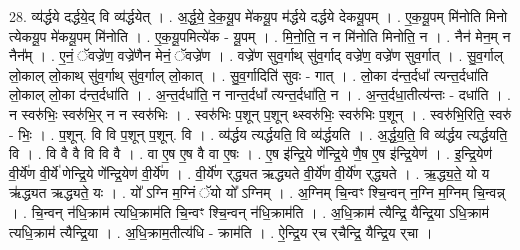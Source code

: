 \documentclass[17pt]{extarticle}
\begin{document}
28. व्य॑र्द्धये दर्द्धये॒द् वि व्य॑र्द्धयेत् । . अ॒र्द्ध॒ये॒ दे॒क॒यू॒प मे॑कयू॒प म॑र्द्धये दर्द्धये देकयू॒पम् । . ए॒क॒यू॒पम् मि॑नोति मिनो त्येकयू॒प मे॑कयू॒पम् मि॑नोति । . ए॒क॒यू॒पमित्ये॑क - यू॒पम् । . मि॒नो॒ति॒ न न मि॑नोति मिनोति॒ न । . नैन॑ मेन॒म् न नैन᳚म् । . ए॒नं॒ ॅवज्रे॑ण॒ वज्रे॑णैन मेनं॒ ॅवज्रे॑ण । . वज्रे॑ण सुव॒र्गाथ् सु॑व॒र्गाद् वज्रे॑ण॒ वज्रे॑ण सुव॒र्गात् । . सु॒व॒र्गाल् लो॒काल् लो॒काथ् सु॑व॒र्गाथ् सु॑व॒र्गाल् लो॒कात् । . सु॒व॒र्गादिति॑ सुवः - गात् । . लो॒का द॑न्त॒र्दधा᳚ त्यन्त॒र्दधा॑ति लो॒काल् लो॒का द॑न्त॒र्दधा॑ति । . अ॒न्त॒र्दधा॑ति॒ न नान्त॒र्दधा᳚ त्यन्त॒र्दधा॑ति॒ न । . अ॒न्त॒र्दधा॒तीत्य॑न्तः - दधा॑ति । . न स्वरु॑भिः॒ स्वरु॑भि॒र् न न स्वरु॑भिः । . स्वरु॑भिः प॒शून् प॒शून् थ्स्वरु॑भिः॒ स्वरु॑भिः प॒शून् । . स्वरु॑भि॒रिति॒ स्वरु॑ - भिः॒ । . प॒शून्. वि वि प॒शून् प॒शून्. वि । . व्य॑र्द्धय त्यर्द्धयति॒ वि व्य॑र्द्धयति । . अ॒र्द्ध॒य॒ति॒ वि व्य॑र्द्धय त्यर्द्धयति॒ वि । . वि वै वै वि वि वै । . वा ए॒ष ए॒ष वै वा ए॒षः । . ए॒ष इ॑न्द्रि॒ये णे᳚न्द्रि॒ये णै॒ष ए॒ष इ॑न्द्रि॒येण॑ । . इ॒न्द्रि॒येण॑ वी॒र्ये॑ण वी॒र्ये॑ णेन्द्रि॒ये णे᳚न्द्रि॒येण॑ वी॒र्ये॑ण । . वी॒र्ये॑ण र्‌द्ध्यत ऋद्ध्यते वी॒र्ये॑ण वी॒र्ये॑ण र्‌द्ध्यते । . ऋ॒द्ध्य॒ते॒ यो य ऋ॑द्ध्यत ऋद्ध्यते॒ यः । . यो᳚ ऽग्नि म॒ग्निं ॅयो यो᳚ ऽग्निम् । . अ॒ग्निम् चि॒न्वꣳ श्चि॒न्वन् न॒ग्नि म॒ग्निम् चि॒न्वन्न् । . चि॒न्वन् न॑धि॒क्राम॑ त्यधि॒क्राम॑ति चि॒न्वꣳ श्चि॒न्वन् न॑धि॒क्राम॑ति । . अ॒धि॒क्राम॑ त्यैन्द्रि॒ यैन्द्रि॒या ऽधि॒क्राम॑ त्यधि॒क्राम॑ त्यैन्द्रि॒या । . अ॒धि॒क्राम॒तीत्य॑धि - क्राम॑ति । . ऐ॒न्द्रि॒य र्‌च र्‌चैन्द्रि॒ यैन्द्रि॒य र्‌चा । \newline
\end{document}
